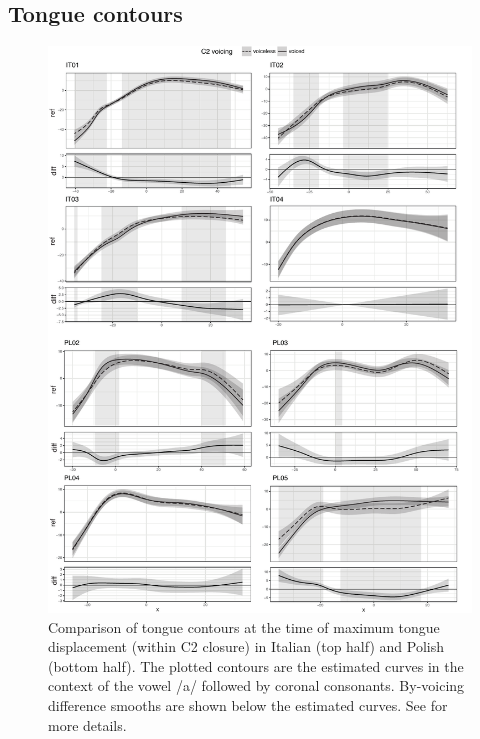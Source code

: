 \documentclass[authoryear, twocolumn]{elsarticle}
\begin{document}

\subsection{Tongue contours}\label{tongue-contours}

\label{s:splines}

\begin{figure}
    \centering
    \includegraphics[height=.9\textheight]{fig/tra.pdf}
    \caption{Comparison of tongue contours at the time of maximum tongue displacement (within C2 closure) in Italian (top half) and Polish (bottom half). The plotted contours are the estimated curves in the context of the vowel /a/ followed by coronal consonants. By-voicing difference smooths are shown below the estimated curves. See  for more details.}
    \label{f:tra}
\end{figure}
\end{document}
